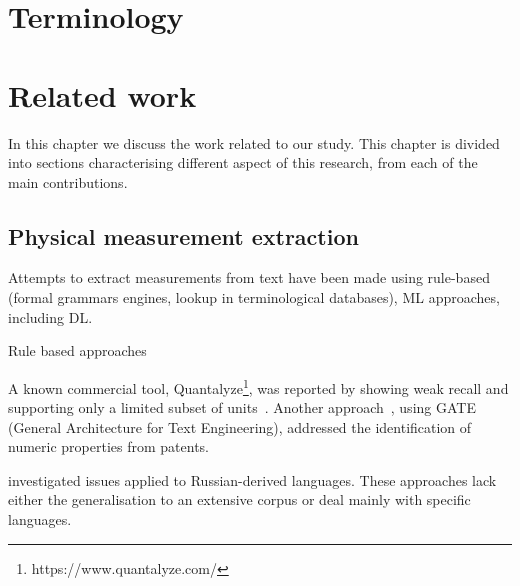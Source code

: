 \documentclass[12pt, a4paper]{report}
\begin{document}


\chapter{Terminology}
\chapter{Related work}
In this chapter we discuss the work related to our study. This chapter is divided into sections characterising different aspect of this research, from each of the main contributions. 


\section{Physical measurement extraction}
Attempts to extract measurements from text have been made using rule-based (formal grammars engines, lookup in terminological databases), ML approaches, including DL. 

Rule based approaches~\cite{10.1145/2766462.2767789, 10.1109/asid50160.2020.9271745}

A known commercial tool, Quantalyze\footnote{https://www.quantalyze.com/}, was reported by \cite{hundman2017measurement} showing weak recall and supporting only a limited subset of units~\cite{aras2014applications}. 
Another approach~\cite{agatonovic2008large}, using GATE (General Architecture for Text Engineering), addressed the identification of numeric properties from patents. 

\cite{am2013processing} investigated issues applied to Russian-derived languages. These approaches lack either the generalisation to an extensive corpus or deal mainly with specific languages. 
\end{document}
